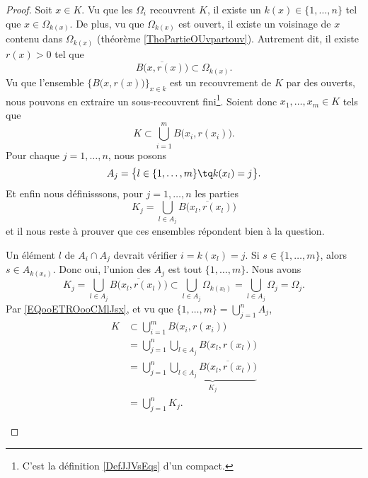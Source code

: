 \begin{proof}
	Soit \( x\in K\). Vu que les \( \Omega_i\) recouvrent \( K\), il existe un \( k(x)\in \{ 1,\ldots, n \}\) tel que \( x\in \Omega_{k(x)}\). De plus, vu que \( \Omega_{k(x)}\) est ouvert, il existe un voisinage de \( x\) contenu dans \( \Omega_{k(x)}\) (théorème \ref{ThoPartieOUvpartouv}). Autrement dit, il existe \( r(x)>0\) tel que
	\begin{equation}
		\overline{ B\big( x,r(x) \big) }\subset  \Omega_{k(x)}.
	\end{equation}
	Vu que l'ensemble \( \{   B\big( x,r(x) \big)    \}_{x\in k}\) est un recouvrement de \( K\) par des ouverts, nous pouvons en extraire un sous-recouvrent fini\footnote{C'est la définition \ref{DefJJVsEqs} d'un compact.}. Soient donc \( x_1,\ldots, x_m\in K\) tels que
	\begin{equation}        \label{EQooETROooCMlJsx}
		K\subset\bigcup_{i=1}^mB\big( x_i, r(x_i) \big).
	\end{equation}
	Pour chaque \( j=1,\ldots, n\), nous posons
	\begin{equation}
		A_j=\big\{ l\in \{ 1,\ldots, m \}\tq k(x_l)=j \big\}.
	\end{equation}
	Et enfin nous définisssons, pour \( j=1,\ldots, n\) les parties
	\begin{equation}
		K_j=\bigcup_{l\in A_j} \overline{ B\big(x_l, r(x_l)\big) }
	\end{equation}
	et il nous reste à prouver que ces ensembles répondent bien à la question.
	\begin{subproof}
		\spitem[\(  \bigcup_{j=1}^n A_j=\{ 1,\ldots, m \}\) est une union disjointe]
		Un élément \( l\) de \( A_i\cap A_j\) devrait vérifier \( i=k(x_l)=j\). Si \( s\in \{ 1,\ldots, m \}\), alors \( s\in A_{k(x_s)}\). Donc oui, l'union des \( A_j\) est tout \( \{ 1,\ldots, m \}\).
		Nous avons
		\begin{equation}
			K_j=\bigcup_{l\in A_j}\overline{ B\big( x_l,r(x_l) \big) }\subset  \bigcup_{l\in A_j}\Omega_{k(x_l)}=\bigcup_{l\in A_j}\Omega_{j}=\Omega_j.
		\end{equation}
		\spitem[\( K\subset\bigcup_{i=1}^nK_i\).]
		Par \eqref{EQooETROooCMlJsx}, et vu que \( \{ 1,\ldots, m \}=\bigcup_{j=1}^nA_j\),
		\begin{subequations}
			\begin{align}
				K & \subset\bigcup_{i=1}^mB\big( x_i, r(x_i) \big)                                            \\
				  & =\bigcup_{j=1}^n\bigcup_{l\in A_j}B\big( x_l,r(x_l) \big)                                 \\
				  & =\bigcup_{j=1}^n\underbrace{\bigcup_{l\in A_j}\overline{  B\big( x_l,r(x_l) \big)}}_{K_j} \\
				  & =\bigcup_{j=1}^nK_j.
			\end{align}
		\end{subequations}
	\end{subproof}
\end{proof}


